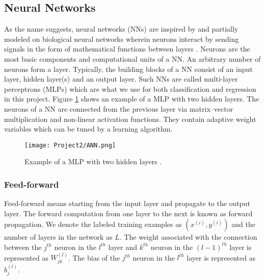 \documentclass[a4paper]{article}
\begin{document}
\subsection{Neural Networks}
\label{sec-nn}
As the name suggests, neural networks (NNs) are inspired by and partially modeled on biological neural networks wherein neurons interact by sending signals in the form of mathematical functions between layers \cite{lec}. Neurons are the most basic components and computational units of a NN. An arbitrary number of neurons form a layer.  Typically, the building blocks of a NN consist of an input layer, hidden layer(s) and an output layer. Such NNs are called multi-layer perceptrons (MLPs) which are what we use for both classification and regression in this project. Figure \ref{ANN} shows an example of a MLP with two hidden layers. The neurons of a NN are connected from the previous layer via matrix–vector multiplication and non-linear activation functions. They contain adaptive weight variables which can be tuned by a learning algorithm.

\begin{figure}[H]
  \centering
  \texttt{[image: Project2/ANN.png]}
  \caption{Example of a MLP with two hidden layers \cite{nielsenneural}.}
    \label{ANN}
\end{figure}

\subsubsection{Feed-forward}
Feed-forward means starting from the input layer and propagate to the output layer. The forward computation from one layer to the next is known as forward propagation. We denote the labeled training examples as $(x^{(i)}, y^{(i)})$ and the number of layers in the network as $L$. The weight associated with the connection between the $j^{th}$ neuron in the $l^{th}$ layer and $k^{th}$ neuron in the $(l-1)^{th}$ layer is represented as $W^{(l)}_{jk}$. The bias of the $j^{th}$ neuron in the $l^{th}$ layer is represented as $b^{(l)}_j$. 
\end{document}
